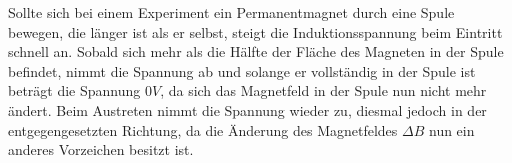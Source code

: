 Sollte sich bei einem Experiment ein Permanentmagnet durch eine Spule bewegen, die länger ist als er selbst, steigt die Induktionsspannung beim Eintritt schnell an. Sobald sich mehr als die Hälfte der Fläche des Magneten in der Spule befindet, nimmt die Spannung ab und solange er vollständig in der Spule ist beträgt die Spannung $0V$, da sich das Magnetfeld in der Spule nun nicht mehr ändert. Beim Austreten nimmt die Spannung wieder zu, diesmal jedoch in der entgegengesetzten Richtung, da die Änderung des Magnetfeldes $\Delta B$ nun ein anderes Vorzeichen besitzt ist.